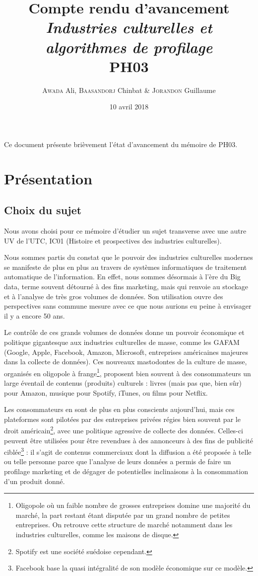 \documentclass[a4paper,10pt]{article}
\author{\textsc{Awada} Ali, \textsc{Baasandorj} Chinbat \& \textsc{Jorandon} Guillaume}
\date{10 avril 2018}
\title{Compte rendu d'avancement\\\large{\textit{Industries culturelles et algorithmes de profilage}}\\\normalsize{PH03}}
\begin{document}
\maketitle

Ce document présente brièvement l'état d'avancement du mémoire de PH03.

\section{Présentation}

\subsection{Choix du sujet}

Nous avons choisi pour ce mémoire d'étudier un sujet transverse avec une autre UV de l'UTC, IC01 (Histoire et prospectives des industries culturelles).

Nous sommes partis du constat que le pouvoir des industries culturelles modernes se manifeste de plus en plus au travers de systèmes informatiques de traitement automatique de l'information. En effet, nous sommes désormais à l'ère du Big data, terme souvent détourné à des fins marketing, mais qui renvoie au stockage et à l'analyse de très gros volumes de données. Son utilisation ouvre des perspectives sans commune mesure avec ce que nous aurions eu peine à envisager il y a encore 50 ans.

Le contrôle de ces grands volumes de données donne un pouvoir économique et politique gigantesque aux industries culturelles de masse, comme les GAFAM (Google, Apple, Facebook, Amazon, Microsoft, entreprises américaines majeures dans la collecte de données). Ces nouveaux mastodontes de la culture de masse, organisés en oligopole à frange\footnote{Oligopole où un faible nombre de grosses entreprises domine une majorité du marché, la part restant étant disputée par un grand nombre de petites entreprises. On retrouve cette structure de marché notamment dans les industries culturelles, comme les maisons de disque.}, proposent bien souvent à des consommateurs un large éventail de contenus (produits) culturels : livres (mais pas que, bien sûr) pour Amazon, musique pour Spotify, iTunes, ou films pour Netflix.

Les consommateurs en sont de plus en plus conscients aujourd'hui, mais ces plateformes sont pilotées par des entreprises privées régies bien souvent par le droit américain\footnote{Spotify est une société suédoise cependant.}, avec une politique agressive de collecte des données. Celles-ci peuvent être utilisées pour être revendues à des annonceurs à des fins de publicité ciblée\footnote{Facebook base la quasi intégralité de son modèle économique sur ce modèle.} : il s'agit de contenus commerciaux dont la diffusion a été proposée à telle ou telle personne parce que l'analyse de leurs données a permis de faire un profilage marketing et de dégager de potentielles inclinaisons à la consommation d'un produit donné. 
\end{document}
